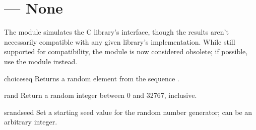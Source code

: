\section{ ---
         None}



The  module simulates the C library's 
interface, though the results aren't necessarily compatible with any
given library's implementation.  While still supported for
compatibility, the  module is now considered obsolete; if
possible, use the  module instead.


\begin{funcdesc}{choice}{seq}
Returns a random element from the sequence .
\end{funcdesc}

\begin{funcdesc}{rand}{}
Return a random integer between 0 and 32767, inclusive.
\end{funcdesc}

\begin{funcdesc}{srand}{seed}
Set a starting seed value for the random number generator; 
can be an arbitrary integer. 
\end{funcdesc}

\begin{seealso}
\end{seealso}

